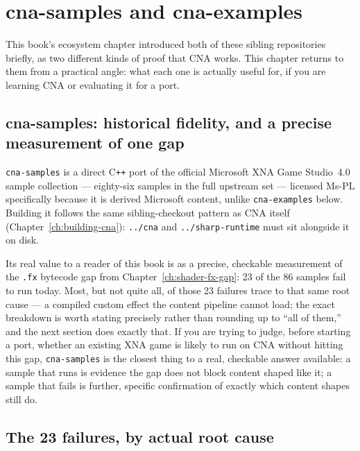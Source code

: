 \chapter{cna-samples and cna-examples}
\label{ch:samples-and-examples}

This book's ecosystem chapter introduced both of these sibling repositories briefly, as two
different kinds of proof that CNA works. This chapter returns to them from a practical
angle: what each one is actually useful for, if you are learning CNA or evaluating it for a
port.

\section{cna-samples: historical fidelity, and a precise measurement of one gap}

\texttt{cna-samples} is a direct C\texttt{++} port of the official Microsoft XNA Game
Studio~4.0 sample collection --- eighty-six samples in the full upstream set --- licensed
Ms-PL specifically because it is derived Microsoft content, unlike \texttt{cna-examples}
below. Building it follows the same sibling-checkout pattern as CNA itself
(Chapter~\ref{ch:building-cna}): \texttt{../cna} and \texttt{../sharp-runtime}
must sit alongside it on disk.

Its real value to a reader of this book is as a precise, checkable measurement of the
\texttt{.fx} bytecode gap from Chapter~\ref{ch:shader-fx-gap}: 23 of the 86 samples fail to
run today. Most, but not quite all, of those 23 failures trace to that same root cause --- a
compiled custom effect the content pipeline cannot load; the exact breakdown is worth stating
precisely rather than rounding up to ``all of them,'' and the next section does exactly that.
If you are trying to judge, before starting a port, whether an existing XNA game is likely to
run on CNA without hitting this gap, \texttt{cna-samples} is the closest thing to a real,
checkable answer available: a sample that runs is evidence the gap does not block content
shaped like it; a sample that fails is further, specific confirmation of exactly which content
shapes still do.

\section{The 23 failures, by actual root cause}

